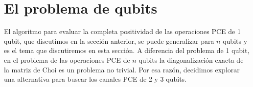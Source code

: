 \section{El problema de  qubits} %
\label{sec:n_qubits_problem}
%

El algoritmo  para evaluar la completa positividad de las operaciones PCE de 1
qubit, que discutimos en la sección anterior, se puede generalizar para $n$
qubits y es 
el tema que discutiremos en esta sección. A diferencia 
del problema de 1 qubit, en el problema de las operaciones PCE de $n$ qubits
la diagonalización exacta de la matriz de Choi es un problema no trivial. 
Por esa razón, decidimos explorar una alternativa para buscar 
los canales PCE de 2 y 3 qubits.

